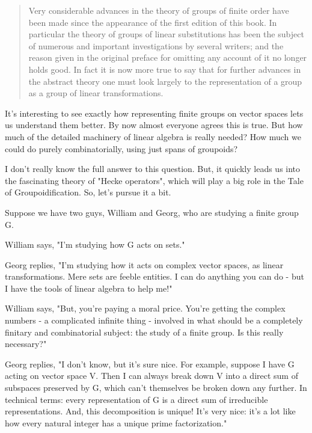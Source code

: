 \begin{quote}
   Very considerable advances in the theory of groups of finite 
   order have been made since the appearance of the first edition 
   of this book.  In particular the theory of groups of linear 
   substitutions has been the subject of numerous and important
   investigations by several writers; and the reason given in the
   original preface for omitting any account of it no longer holds
   good.  In fact it is now more true to say that for further 
   advances in the abstract theory one must look largely to the 
   representation of a group as a group of linear transformations.
\end{quote}
    

It's interesting to see exactly how representing finite groups on vector
spaces lets us understand them better.  By now almost everyone agrees 
this is true.  But how much of the detailed 
machinery of linear algebra is really needed?  How much we could 
do purely combinatorially, using just spans of groupoids?

I don't really know the full answer to this question.  But, it quickly
leads us into the fascinating theory of "Hecke operators", which will
play a big role in the Tale of Groupoidification.  So, let's pursue it 
a bit.

Suppose we have two guys, William and Georg, who are studying a finite
group G.  

William says, "I'm studying how G acts on sets."

Georg replies, "I'm studying how it acts on complex vector spaces, 
as linear transformations.  Mere sets are feeble entities.  I can do 
anything you can do - but I have the tools of linear algebra to help me!"

William says, "But, you're paying a moral price.  You're getting the
complex numbers - a complicated infinite thing - involved in what
should be a completely finitary and combinatorial subject: the study
of a finite group.  Is this really necessary?"

Georg replies, "I don't know, but it's sure nice.  For example,
suppose I have G acting on vector space V.  Then I can always 
break down V into a direct sum of subspaces preserved by G, which 
can't themselves be broken down any further.  In technical terms:
every representation of G is a direct sum of irreducible representations.
And, this decomposition is unique!  It's very nice: it's a lot like
how every natural integer has a unique prime factorization."


